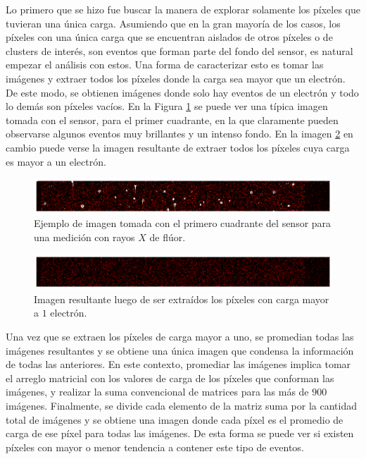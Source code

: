 Lo primero que se hizo fue buscar la manera de explorar solamente los píxeles que tuvieran una única carga. Asumiendo que en la gran mayoría de los casos, los píxeles con una única carga que se encuentran aislados de otros píxeles o de clusters de interés, son eventos que forman parte del fondo del sensor, es natural empezar el análisis con estos. Una forma de caracterizar esto es tomar las imágenes y extraer todos los píxeles donde la carga sea mayor que un electrón. De este modo, se obtienen imágenes donde solo hay eventos de un electrón y todo lo demás son píxeles vacíos. En la Figura \ref{fig:ImagenFitsOriginal} se puede ver una típica imagen tomada con el sensor, para el primer cuadrante, en la que claramente pueden observarse algunos eventos muy brillantes y un intenso fondo. En la imagen \ref{fig:ImagenFits1e} en cambio puede verse la imagen resultante de extraer todos los píxeles cuya carga es mayor a un electrón.
\begin{figure}[h]
    \centering
    \includegraphics[scale=0.4]{Figs/imagen_fits_original.pdf}
    \caption{Ejemplo de imagen tomada con el primero cuadrante del sensor para una medición con rayos $X$ de flúor.}
    \label{fig:ImagenFitsOriginal}
\end{figure}

\begin{figure}[h]
    \centering
    \includegraphics[scale=0.4]{Figs/imagen_fits_1_e.pdf}
    \caption{Imagen resultante luego de ser extraídos los píxeles con carga mayor a $1$ electrón.}
    \label{fig:ImagenFits1e}
\end{figure}
Una vez que se extraen los píxeles de carga mayor a uno, se promedian todas las imágenes resultantes y se obtiene una única imagen que condensa la información de todas las anteriores. En este contexto, promediar las imágenes implica tomar el arreglo matricial con los valores de carga de los píxeles que conforman las imágenes, y realizar la suma convencional de matrices para las más de $900$ imágenes. Finalmente, se divide cada elemento de la matriz suma por la cantidad total de imágenes y se obtiene una imagen donde cada píxel es el promedio de carga de ese píxel para todas las imágenes. De esta forma se puede ver si existen píxeles con mayor o menor tendencia a contener este tipo de eventos.

